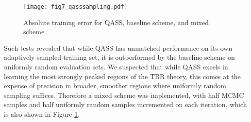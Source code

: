 \begin{figure}[h]
  \centering
    \texttt{[image: fig7\_qasssampling.pdf]}
    \caption{Absolute training error for QASS, baseline scheme, and mixed scheme}
  \label{fig:qasssampling}
\end{figure}

Such tests revealed that while QASS has unmatched performance on its own adaptively-sampled training set, it is outperformed by the baseline scheme on uniformly random evaluation sets. We suspected that while QASS excels in learning the most strongly peaked regions of the TBR theory, this comes at the expense of precision in broader, smoother regions where uniformly random sampling suffices. Therefore a mixed scheme was implemented, with half MCMC samples and half uniformly random samples incremented on each iteration, which is also shown in Figure \ref{fig:qasssampling}.

